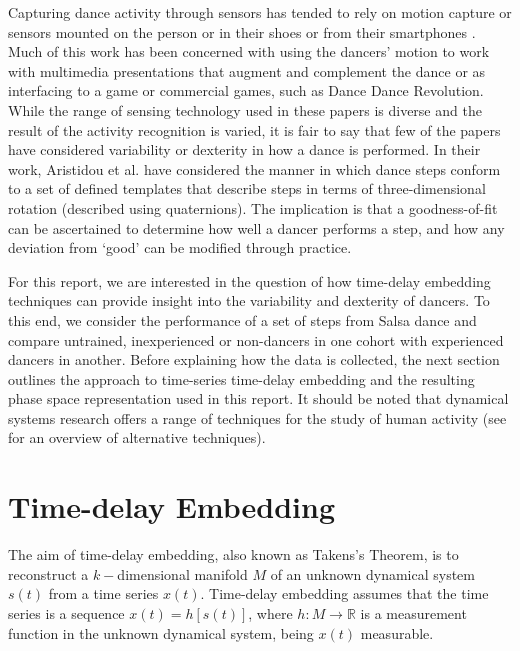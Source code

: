 \documentclass[10pt,journal,compsoc]{IEEEtran}
\begin{document}
Capturing dance activity through sensors has tended to rely on motion capture 
\cite{Alexiadis2014} or sensors mounted on the person \cite{Lynch2005} 
or in their shoes \cite{Paradiso1997} or from their smartphones  \cite{Wei2014}.
Much of this work has been concerned with using the dancers’ motion to work with 
multimedia presentations that augment and complement the dance \cite{Griffith1998, Park2006}
or as interfacing to a game \cite{Chu2012} or commercial games, such as Dance Dance Revolution.  
While the range of sensing technology used in these papers is diverse and the result of the activity 
recognition is varied, it is fair to say that few of the papers have considered 
variability or dexterity in how a dance is performed. 
In their work, Aristidou et al. \cite{Aristidou2014}
have considered the manner in which dance steps conform to a set of defined 
templates that describe steps in terms of three-dimensional rotation (described using quaternions).  
The implication is that a goodness-of-fit can be ascertained to determine how well a dancer 
performs a step, and how any deviation from ‘good’ can be modified through practice. 

For this report, we are interested in the question of how time-delay embedding techniques 
can provide insight into the variability and dexterity of dancers. 
To this end, we consider the performance of a set of steps from Salsa dance and 
compare untrained, inexperienced or non-dancers in one cohort with experienced dancers in another. 
Before explaining how the data is collected, the next section outlines the approach to time-series 
time-delay embedding and the resulting phase space representation used in this report. 
It should be noted that dynamical systems research offers a range of techniques for the study of 
human activity (see \cite{Guastello2011} for an overview of alternative techniques). 







\section{Time-delay Embedding}
The aim of time-delay embedding, also known as Takens's Theorem, is to reconstruct 
a $k-$dimensional manifold $M$ of an unknown dynamical system $s(t)$ 
from a time series $x(t)$. Time-delay embedding assumes that the time series 
is a sequence $x(t)=h[s(t)]$,  where  $h: M \rightarrow \mathbb{R}$ 
is a measurement function in the unknown dynamical system, being $x(t)$ measurable.
\end{document}
